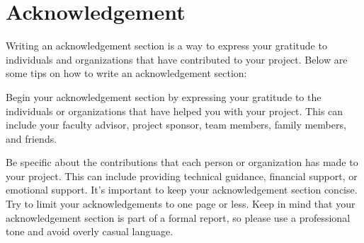 \clearpage
\section*{Acknowledgement}

Writing an acknowledgement section is a way to express your gratitude to individuals and organizations that have contributed to your project. Below are some tips on how to write an acknowledgement section:

Begin your acknowledgement section by expressing your gratitude to the individuals or organizations that have helped you with your project. This can include your faculty advisor, project sponsor, team members, family members, and friends.

Be specific about the contributions that each person or organization has made to your project. This can include providing technical guidance, financial support, or emotional support.
It's important to keep your acknowledgement section concise. Try to limit your acknowledgements to one page or less.
Keep in mind that your acknowledgement section is part of a formal report, so please use a professional tone and avoid overly casual language.
